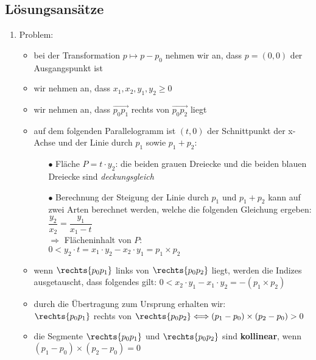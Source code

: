 \subsection*{Lösungsansätze}
\begin{enumerate}
	\item Problem:
		\begin{itemize}
			\item bei der Transformation $p \mapsto p-p_0$ nehmen wir an, dass $p=(0,0)$ der Ausgangspunkt ist
			\item wir nehmen an, dass $x_1,x_2,y_1,y_2 \geq 0$
			\item wir nehmen an, dass $\overrightarrow{p_0p_1}$ rechts von $\overrightarrow{p_0p_2}$ liegt
			\item auf dem folgenden Parallelogramm ist $(t,0)$ der Schnittpunkt der x-Achse und der Linie durch $p_1$ sowie $p_1+p_2$:\\
				\begin{minipage}{0.3\textwidth}
					
				\end{minipage}\hfill
				\begin{minipage}{0.6\textwidth}
					\begin{itemize}
						\item[$\bullet$] Fläche $P=t\cdot y_2$: die beiden grauen Dreiecke und die beiden blauen Dreiecke sind \textit{deckungsgleich}
						\item[$\bullet$] Berechnung der Steigung der Linie durch $p_1$ und $p_1+p_2$ kann auf zwei Arten berechnet werden, welche die folgenden Gleichung ergeben:\\
						$\dfrac{y_2}{x_2}=\dfrac{y_1}{x_1-t}$\\
						$\Rightarrow $ Flächeninhalt von $P$:\\
						$0 < y_2 \cdot t = x_1\cdot y_2 -x_2 \cdot y_1 = p_1 \times p_2$
					\end{itemize}
				\end{minipage}
			\item wenn $\rechts{p_0p_1}$ links von $\rechts{p_0p_2}$ liegt, werden die Indizes ausgetauscht, dass folgendes gilt: $0 < x_2 \cdot y_1-x_1 \cdot y_2 = -(p_1 \times p_2)$
			\item durch die Übertragung zum Ursprung erhalten wir:\\
			$\rechts{p_0p_1}$ rechts von $\rechts{p_0p_2} \Longleftrightarrow (p_1-p_0) \times (p_2-p_0) >0$ 
			\item die Segmente $\rechts{p_0p_1}$ und $\rechts{p_0p_2}$ sind \textbf{kollinear}, wenn $(p_1-p_0) \times (p_2-p_0) =0$
		\end{itemize}
\setcounter{temp}{\value{enumi}}
\end{enumerate}
